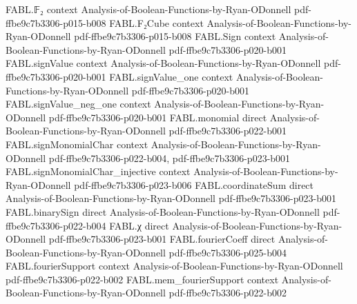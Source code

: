 \begin{theorem}
\label{FABL.functionAlgebraicDegree_le_of_isVectorFourierGranular_booleanRealEmbedding}
\leanok
{}
\proofstep
  {FABL.𝔽₂}
  {context}
  {Analysis-of-Boolean-Functions-by-Ryan-ODonnell}
  {pdf-ffbe9c7b3306-p015-b008}
\proofstep
  {FABL.F₂Cube}
  {context}
  {Analysis-of-Boolean-Functions-by-Ryan-ODonnell}
  {pdf-ffbe9c7b3306-p015-b008}
\proofstep
  {FABL.Sign}
  {context}
  {Analysis-of-Boolean-Functions-by-Ryan-ODonnell}
  {pdf-ffbe9c7b3306-p020-b001}
\proofstep
  {FABL.signValue}
  {context}
  {Analysis-of-Boolean-Functions-by-Ryan-ODonnell}
  {pdf-ffbe9c7b3306-p020-b001}
\proofstep
  {FABL.signValue_one}
  {context}
  {Analysis-of-Boolean-Functions-by-Ryan-ODonnell}
  {pdf-ffbe9c7b3306-p020-b001}
\proofstep
  {FABL.signValue_neg_one}
  {context}
  {Analysis-of-Boolean-Functions-by-Ryan-ODonnell}
  {pdf-ffbe9c7b3306-p020-b001}
\proofstep
  {FABL.monomial}
  {direct}
  {Analysis-of-Boolean-Functions-by-Ryan-ODonnell}
  {pdf-ffbe9c7b3306-p022-b001}
\proofstep
  {FABL.signMonomialChar}
  {context}
  {Analysis-of-Boolean-Functions-by-Ryan-ODonnell}
  {pdf-ffbe9c7b3306-p022-b004,
    pdf-ffbe9c7b3306-p023-b001}
\proofstep
  {FABL.signMonomialChar_injective}
  {context}
  {Analysis-of-Boolean-Functions-by-Ryan-ODonnell}
  {pdf-ffbe9c7b3306-p023-b006}
\proofstep
  {FABL.coordinateSum}
  {direct}
  {Analysis-of-Boolean-Functions-by-Ryan-ODonnell}
  {pdf-ffbe9c7b3306-p023-b001}
\proofstep
  {FABL.binarySign}
  {direct}
  {Analysis-of-Boolean-Functions-by-Ryan-ODonnell}
  {pdf-ffbe9c7b3306-p022-b004}
\proofstep
  {FABL.χ}
  {direct}
  {Analysis-of-Boolean-Functions-by-Ryan-ODonnell}
  {pdf-ffbe9c7b3306-p023-b001}
\proofstep
  {FABL.fourierCoeff}
  {direct}
  {Analysis-of-Boolean-Functions-by-Ryan-ODonnell}
  {pdf-ffbe9c7b3306-p025-b004}
\proofstep
  {FABL.fourierSupport}
  {context}
  {Analysis-of-Boolean-Functions-by-Ryan-ODonnell}
  {pdf-ffbe9c7b3306-p022-b002}
\proofstep
  {FABL.mem_fourierSupport}
  {context}
  {Analysis-of-Boolean-Functions-by-Ryan-ODonnell}
  {pdf-ffbe9c7b3306-p022-b002}

\end{theorem}
